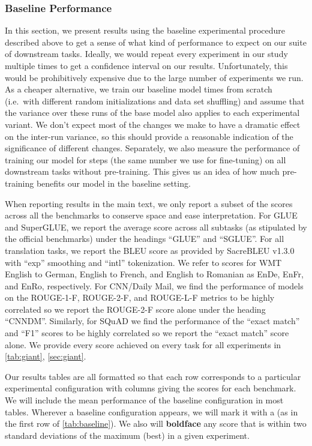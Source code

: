 \documentclass[twoside,11pt]{article}
\begin{document}
\subsubsection{Baseline Performance}

In this section, we present results using the baseline experimental procedure described above to get a sense of what kind of performance to expect on our suite of downstream tasks.
Ideally, we would repeat every experiment in our study multiple times to get a confidence interval on our results.
Unfortunately, this would be prohibitively expensive due to the large number of experiments we run.
As a cheaper alternative, we train our baseline model  times from scratch (i.e.\ with different random initializations and data set shuffling) and assume that the variance over these runs of the base model also applies to each experimental variant.
We don't expect most of the changes we make to have a dramatic effect on the inter-run variance, so this should provide a reasonable indication of the significance of different changes.
Separately, we also measure the performance of training our model for  steps (the same number we use for fine-tuning) on all downstream tasks without pre-training.
This gives us an idea of how much pre-training benefits our model in the baseline setting.

When reporting results in the main text, we only report a subset of the scores across all the benchmarks to conserve space and ease interpretation.
For GLUE and SuperGLUE, we report the average score across all subtasks (as stipulated by the official benchmarks) under the headings ``GLUE'' and ``SGLUE''.
For all translation tasks, we report the BLEU score \citep{papineni2002bleu} as provided by SacreBLEU v1.3.0 \citep{post2018call} with ``exp'' smoothing and ``intl'' tokenization.
We refer to scores for WMT English to German, English to French, and English to Romanian as EnDe, EnFr, and EnRo, respectively.
For CNN/Daily Mail, we find the performance of models on the ROUGE-1-F, ROUGE-2-F, and ROUGE-L-F metrics \citep{lin2004rouge} to be highly correlated so we report the ROUGE-2-F score alone under the heading ``CNNDM''.
Similarly, for SQuAD we find the performance of the ``exact match'' and ``F1'' scores to be highly correlated so we report the ``exact match'' score alone.
We provide every score achieved on every task for all experiments in \cref{tab:giant}, \cref{sec:giant}.

Our results tables are all formatted so that each row corresponds to a particular experimental configuration with columns giving the scores for each benchmark.
We will include the mean performance of the baseline configuration in most tables.
Wherever a baseline configuration appears, we will mark it with a  (as in the first row of \cref{tab:baseline}).
We also will \textbf{boldface} any score that is within two standard deviations of the maximum (best) in a given experiment.
\end{document}
